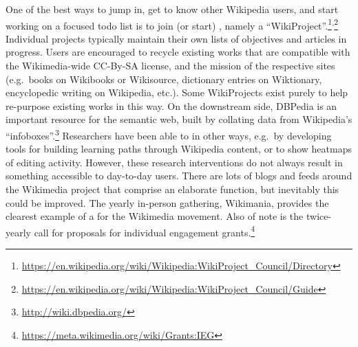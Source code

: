 One of the best ways to jump in, get to know other Wikipedia users,
and start working on a focused todo list is to join (or start)
, namely a
``WikiProject''.\footnote{\url{https://en.wikipedia.org/wiki/Wikipedia:WikiProject_Council/Directory}}\textsuperscript{,}\footnote{\url{https://en.wikipedia.org/wiki/Wikipedia:WikiProject_Council/Guide}}
Individual projects typically maintain their own lists of objectives
and articles in progress.
%
Users are encouraged to recycle existing works that are compatible
with the Wikimedia-wide CC-By-SA license, and the mission of the
respective sites (e.g.~books on Wikibooks or Wikisource, dictionary
entries on Wiktionary, encyclopedic writing on Wikipedia, etc.).  Some
WikiProjects exist purely to help re-purpose existing works in this
way.  On the downstream side, DBPedia is an important resource for the
semantic web, built by collating data from Wikipedia's
``infoboxes''.\footnote{\url{http://wiki.dbpedia.org/}} Researchers
have been able to  in other ways,
e.g.~by developing tools for building learning paths through Wikipedia
content, or to show heatmaps of editing activity.  However, these
research interventions do not always result in something accessible to
day-to-day users. There are lots of blogs and feeds around the
Wikimedia project that comprise an elaborate 
function, but inevitably this could be improved.
% 
The yearly in-person gathering, Wikimania, provides the clearest
example of a  for the Wikimedia movement. Also
of note is the twice-yearly call for proposals for individual
engagement
grants.\footnote{\url{https://meta.wikimedia.org/wiki/Grants:IEG}}

